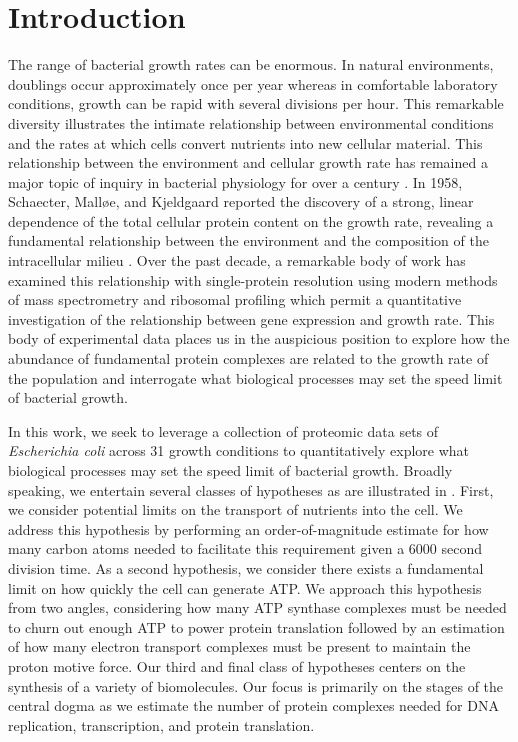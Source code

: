 

\section{Introduction}
The range of bacterial growth rates can be enormous. In natural environments,
doublings occur approximately once per year whereas in comfortable laboratory
conditions, growth can be rapid with several divisions per hour.
This remarkable diversity illustrates the intimate relationship between
environmental conditions and the rates at which cells convert nutrients into
new cellular material. This relationship between the environment and cellular
growth rate has remained a major topic of inquiry in bacterial physiology for
over a century \citep{jun2018}. In 1958, Schaecter, Mall\o e, and Kjeldgaard
reported the discovery of a strong, linear dependence of the total
cellular protein content on the growth rate,  revealing a fundamental relationship
between the environment and the composition of the intracellular milieu \citep{schaechter1958}.
Over the past decade, a remarkable body
of work has examined this relationship with single-protein resolution using
modern methods of mass spectrometry \citep{valgepea2013,
peebo2015, schmidt2016} and ribosomal profiling \citep{li2014} which permit a
quantitative investigation of the relationship between gene expression and
growth rate. This body of experimental data places us in the auspicious position to
explore how the abundance of fundamental protein complexes are related to the
growth rate of the population and interrogate what biological processes may set
the speed limit of bacterial growth.

In this work, we seek to leverage a collection of proteomic data sets of
\textit{Escherichia coli} across 31 growth conditions to
quantitatively explore what biological processes may set the speed limit of
bacterial growth. Broadly speaking, we entertain several classes of hypotheses
as are illustrated in . First, we consider potential limits on the
transport of nutrients into the cell. We address this hypothesis by performing
an order-of-magnitude estimate for how many carbon atoms needed to facilitate this
requirement given a 6000 second division time.  As a second hypothesis, we consider there exists a fundamental limit on how
quickly the cell can generate ATP. We approach this hypothesis from two angles,
considering how many ATP synthase complexes must be needed to churn out enough
ATP to power protein translation followed by an estimation of how many electron
transport complexes must be present to maintain the proton motive force. Our third and final class of hypotheses centers on the synthesis of a variety of
biomolecules. Our focus is primarily on the stages of the central dogma as we
estimate the number of protein complexes needed for DNA replication,
transcription, and protein translation.

